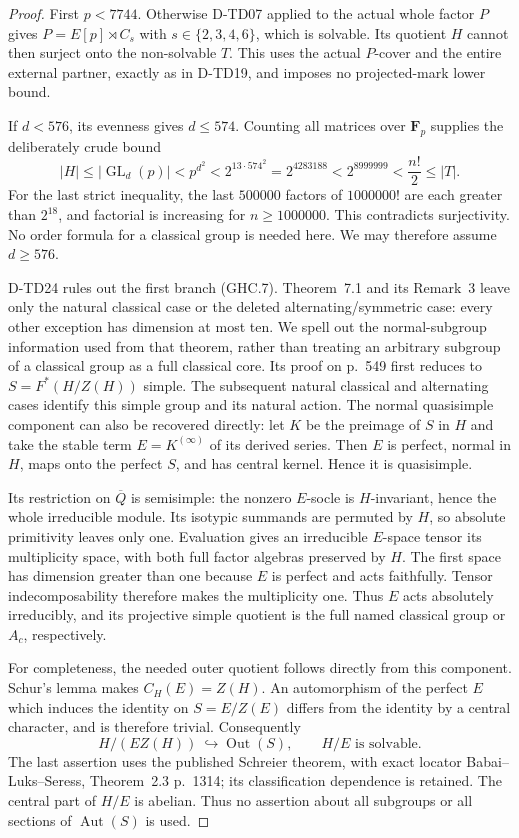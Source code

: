 \begin{proof}
First $p<7744$.  Otherwise D-TD07 applied to the actual whole
factor $P$ gives $P=E[p]\rtimes C_s$ with
$s\in\{2,3,4,6\}$, which is solvable.  Its quotient $H$
cannot then surject onto the non-solvable $T$.  This uses the
actual $P$-cover and the entire external partner, exactly as
in D-TD19, and imposes no projected-mark lower bound.

If $d<576$, its evenness gives $d\le574$.  Counting all matrices
over $\mathbf F_p$ supplies the deliberately crude bound
\[
 |H|\le|\operatorname{GL}_d(p)|<p^{d^2}
       <2^{13\cdot574^2}=2^{4283188}
       <2^{8999999}<\frac{n!}{2}\le|T|.
 \tag{GHC.9}
\]
For the last strict inequality, the last $500000$ factors of
$1000000!$ are each greater than $2^{18}$, and factorial is
increasing for $n\ge1000000$.  This contradicts surjectivity.
No order formula for a classical group is needed here.
We may therefore assume $d\ge576$.

D-TD24 rules out the first branch (GHC.7).  Theorem~7.1 and its
Remark~3 leave only the natural classical case or the deleted
alternating/symmetric case: every other exception has dimension
at most ten.  We spell out the normal-subgroup information used
from that theorem, rather than treating an arbitrary subgroup of
a classical group as a full classical core.  Its proof on p.~549
first reduces to $S=F^*(H/Z(H))$ simple.  The subsequent natural
classical and alternating cases identify this simple group and
its natural action.  The normal quasisimple component can also
be recovered directly: let $K$ be the preimage of $S$ in $H$
and take the stable term $E=K^{(\infty)}$ of its derived series.
Then $E$ is perfect, normal in $H$, maps onto the perfect $S$,
and has central kernel.  Hence it is quasisimple.

Its restriction on $\overline Q$ is semisimple: the nonzero
$E$-socle is $H$-invariant, hence the whole irreducible module.
Its isotypic summands are permuted by $H$, so absolute
primitivity leaves only one.  Evaluation gives an irreducible
$E$-space tensor its multiplicity space, with both full factor
algebras preserved by $H$.  The first space has dimension
greater than one because $E$ is perfect and acts faithfully.
Tensor indecomposability therefore makes the multiplicity one.
Thus $E$ acts absolutely irreducibly, and its projective simple
quotient is the full named classical group or $A_c$, respectively.

For completeness, the needed outer quotient follows directly
from this component.  Schur's lemma makes $C_H(E)=Z(H)$.
An automorphism of the perfect $E$ which induces the identity
on $S=E/Z(E)$ differs from the identity by a central character,
and is therefore trivial.  Consequently
\[
       H/(EZ(H))\ \hookrightarrow\operatorname{Out}(S),
       \qquad H/E\text{ is solvable}.
 \tag{GHC.10}
\]
The last assertion uses the published Schreier theorem, with
exact locator Babai--Luks--Seress, Theorem~2.3 p.~1314;
its classification dependence is retained.\cite{HD:BabaiLuksSeress1997}
The central part of $H/E$ is abelian.  Thus no assertion about
all subgroups or all sections of $\operatorname{Aut}(S)$ is used.


\end{proof}
